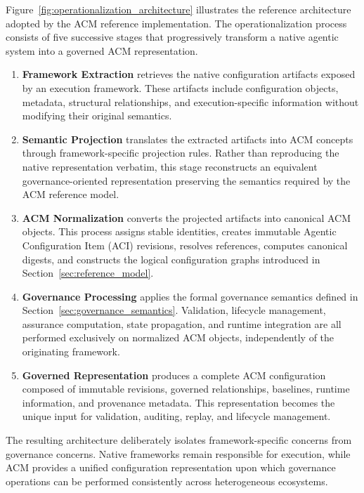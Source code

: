 \documentclass[10pt]{article}
\begin{document}
Figure~\ref{fig:operationalization_architecture} illustrates the reference architecture adopted by the ACM reference implementation. The operationalization process consists of five successive stages that progressively transform a native agentic system into a governed ACM representation.

\begin{enumerate}
    \item \textbf{Framework Extraction} retrieves the native configuration artifacts exposed by an execution framework. These artifacts include configuration objects, metadata, structural relationships, and execution-specific information without modifying their original semantics.

    \item \textbf{Semantic Projection} translates the extracted artifacts into ACM concepts through framework-specific projection rules. Rather than reproducing the native representation verbatim, this stage reconstructs an equivalent governance-oriented representation preserving the semantics required by the ACM reference model.

    \item \textbf{ACM Normalization} converts the projected artifacts into canonical ACM objects. This process assigns stable identities, creates immutable Agentic Configuration Item (ACI) revisions, resolves references, computes canonical digests, and constructs the logical configuration graphs introduced in Section~\ref{sec:reference_model}.

    \item \textbf{Governance Processing} applies the formal governance semantics defined in Section~\ref{sec:governance_semantics}. Validation, lifecycle management, assurance computation, state propagation, and runtime integration are all performed exclusively on normalized ACM objects, independently of the originating framework.

    \item \textbf{Governed Representation} produces a complete ACM configuration composed of immutable revisions, governed relationships, baselines, runtime information, and provenance metadata. This representation becomes the unique input for validation, auditing, replay, and lifecycle management.
\end{enumerate}

The resulting architecture deliberately isolates framework-specific concerns from governance concerns. Native frameworks remain responsible for execution, while ACM provides a unified configuration representation upon which governance operations can be performed consistently across heterogeneous ecosystems.
\end{document}
